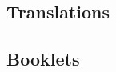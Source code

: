 \documentclass[12pt]{article}
\begin{document}
\autocite{crane75aa}

\autocite{octovian86aa}

\autocite{shakespeare92aa}

\autocite{edgeworth92aa}

\autocite{twain93aa}

\autocite{austen01aa}

\autocite{smith02aa}


\subsection{Translations}


\autocite{levi87aa}

\autocite{esquivel92ab}

\autocite{mu76aa}

\autocite{hildegard-of-bingen01aa}

\autocite{esquivel92aa}


\subsection{Booklets}

\autocite{renoir94aa}

\end{document}
